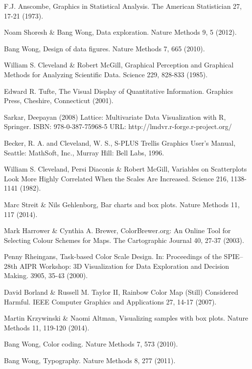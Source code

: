 \documentclass[letterpaper]{report}\usepackage[]{graphicx}\usepackage[]{color}
\begin{document}
\begin{thebibliography}{1}
F.J. Anscombe, Graphics in Statistical Analysis. The American Statistician 27, 17-21 (1973).

Noam Shoresh \& Bang Wong, Data exploration. Nature Methods 9, 5 (2012).

Bang Wong, Design of data figures. Nature Methods 7, 665 (2010).

William S. Cleveland \& Robert McGill, Graphical Perception and Graphical Methods for Analyzing Scientific Data. Science 229, 828-833 (1985).

Edward R. Tufte, The Visual Display of Quantitative Information. Graphics Press, Cheshire, Connecticut (2001).

Sarkar, Deepayan (2008) Lattice: Multivariate Data Visualization with R, Springer.  ISBN: 978-0-387-75968-5 URL: http://lmdvr.r-forge.r-project.org/

Becker, R. A. and Cleveland, W. S., S-PLUS Trellis Graphics User’s Manual, Seattle: MathSoft, Inc., Murray Hill: Bell Labs, 1996.

William S. Cleveland, Persi Diaconis \& Robert McGill, Variables on Scatterplots Look More Highly Correlated When the Scales Are Increased. Science 216, 1138-1141 (1982).

Marc Streit \& Nils Gehlenborg, Bar charts and box plots. Nature Methods 11, 117 (2014).

Mark Harrower \& Cynthia A. Brewer, ColorBrewer.org: An Online Tool for Selecting Colour Schemes for Maps. The Cartographic Journal 40, 27-37 (2003).

Penny Rheingans, Task-based Color Scale Design. In: Proceedings of the SPIE--28th AIPR Workshop: 3D Visualization for Data Exploration and Decision Making. 3905, 35-43 (2000).

David Borland \& Russell M. Taylor II, Rainbow Color Map (Still) Considered Harmful. IEEE Computer Graphics and Applications 27, 14-17 (2007).

Martin Krzywinski \& Naomi Altman, Visualizing samples with box plots. Nature Methods 11, 119-120 (2014).

Bang Wong, Color coding. Nature Methods 7, 573 (2010).

Bang Wong, Typography. Nature Methods 8, 277 (2011).


\end{thebibliography}
\end{document}
